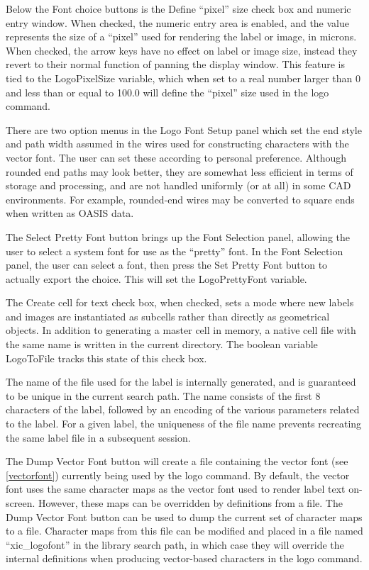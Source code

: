 Below the {\cb Font} choice buttons is the {\cb Define ``pixel'' size}
check box and numeric entry window.  When checked, the numeric entry
area is enabled, and the value represents the size of a ``pixel'' used
for rendering the label or image, in microns.  When checked, the arrow
keys have no effect on label or image size, instead they revert to
their normal function of panning the display window.  This feature is
tied to the {\et LogoPixelSize} variable, which when set to a real
number larger than 0 and less than or equal to 100.0 will define the
``pixel'' size used in the {\cb logo} command.

There are two option menus in the {\cb Logo Font Setup} panel which
set the end style and path width assumed in the wires used for
constructing characters with the vector font.  The user can set these
according to personal preference.  Although rounded end paths may look
better, they are somewhat less efficient in terms of storage and
processing, and are not handled uniformly (or at all) in some CAD
environments.  For example, rounded-end wires may be converted to
square ends when written as OASIS data.

The {\cb Select Pretty Font} button brings up the {\cb Font Selection}
panel, allowing the user to select a system font for use as the
``pretty'' font.  In the {\cb Font Selection} panel, the user can
select a font, then press the {\cb Set Pretty Font} button to actually
export the choice.  This will set the {\et LogoPrettyFont} variable.

The {\cb Create cell for text} check box, when checked, sets a mode
where new labels and images are instantiated as subcells rather than
directly as geometrical objects.  In addition to generating a master
cell in memory, a native cell file with the same name is written in
the current directory.  The boolean variable {\et LogoToFile} tracks
this state of this check box.

The name of the file used for the label is internally generated, and
is guaranteed to be unique in the current search path.  The name
consists of the first 8 characters of the label, followed by an
encoding of the various parameters related to the label.  For a given
label, the uniqueness of the file name prevents recreating the same
label file in a subsequent session.

The {\cb Dump Vector Font} button will create a file containing the
vector font (see \ref{vectorfont}) currently being used by the {\cb
logo} command.  By default, the vector font uses the same character
maps as the vector font used to render label text on-screen.  However,
these maps can be overridden by definitions from a file.  The {\cb
Dump Vector Font} button can be used to dump the current set of
character maps to a file.  Character maps from this file can be
modified and placed in a file named ``{\vt xic\_logofont}'' in the
library search path, in which case they will override the internal
definitions when producing vector-based characters in the {\cb logo}
command.


